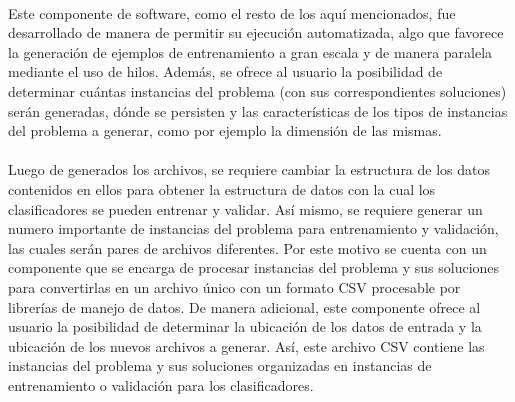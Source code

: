 \paragraph{} Este componente de software, como el resto de los aquí mencionados, fue desarrollado de manera de permitir su ejecución automatizada, algo que favorece la generación de ejemplos de entrenamiento a gran escala y de manera paralela mediante el uso de hilos. Además, se ofrece al usuario la posibilidad de determinar cuántas instancias del problema (con sus correspondientes soluciones) serán generadas, dónde se persisten y las características de los tipos de instancias del problema a generar, como por ejemplo la dimensión de las mismas.

\paragraph{} Luego de generados los archivos, se requiere cambiar la estructura de los datos contenidos en ellos para obtener la estructura de datos con la cual los clasificadores se pueden entrenar y validar. Así mismo, se requiere generar un numero importante de instancias del problema para entrenamiento y validación, las cuales serán pares de archivos diferentes. Por este motivo se cuenta con un componente que se encarga de procesar instancias del problema y sus soluciones para convertirlas en un archivo único con un formato CSV procesable por librerías de manejo de datos. De manera adicional, este componente ofrece al usuario la posibilidad de determinar la ubicación de los datos de entrada y la ubicación de los nuevos archivos a generar. Así, este archivo CSV contiene las instancias del problema y sus soluciones organizadas en instancias de entrenamiento o validación para los clasificadores.


